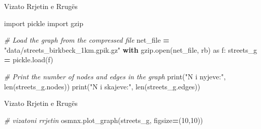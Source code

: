 \documentclass[
  ignorenonframetext,
]{beamer}
\newenvironment{Shaded}{\begin{snugshade}}{\end{snugshade}}
\newcommand{\BuiltInTok}[1]{#1}
\newcommand{\CommentTok}[1]{\textcolor[rgb]{0.56,0.35,0.01}{\textit{#1}}}
\newcommand{\ControlFlowTok}[1]{\textcolor[rgb]{0.13,0.29,0.53}{\textbf{#1}}}
\newcommand{\DecValTok}[1]{\textcolor[rgb]{0.00,0.00,0.81}{#1}}
\newcommand{\ImportTok}[1]{#1}
\newcommand{\NormalTok}[1]{#1}
\newcommand{\OperatorTok}[1]{\textcolor[rgb]{0.81,0.36,0.00}{\textbf{#1}}}
\newcommand{\StringTok}[1]{\textcolor[rgb]{0.31,0.60,0.02}{#1}}
\begin{document}
\begin{frame}[fragile]{Vizato Rrjetin e Rrugës}
\protect\hypertarget{vizato-rrjetin-e-rruguxebs-1}{}

\begin{Shaded}
\begin{Highlighting}[]
\ImportTok{import}\NormalTok{ pickle}
\ImportTok{import}\NormalTok{ gzip}

\CommentTok{\# Load the graph from the compressed file}
\NormalTok{net\_file }\OperatorTok{=} \StringTok{"data/streets\_birkbeck\_1km.gpik.gz"}
\ControlFlowTok{with}\NormalTok{ gzip.}\BuiltInTok{open}\NormalTok{(net\_file, }\StringTok{\textquotesingle{}rb\textquotesingle{}}\NormalTok{) }\ImportTok{as}\NormalTok{ f:}
\NormalTok{    streets\_g }\OperatorTok{=}\NormalTok{ pickle.load(f)}

\CommentTok{\# Print the number of nodes and edges in the graph}
\BuiltInTok{print}\NormalTok{(}\StringTok{"N i nyjeve:"}\NormalTok{, }\BuiltInTok{len}\NormalTok{(streets\_g.nodes))}
\BuiltInTok{print}\NormalTok{(}\StringTok{"N i skajeve:"}\NormalTok{, }\BuiltInTok{len}\NormalTok{(streets\_g.edges))}
\end{Highlighting}
\end{Shaded}
\end{frame}

\begin{frame}[fragile]{Vizato Rrjetin e Rrugës}
\protect\hypertarget{vizato-rrjetin-e-rruguxebs-2}{}

\begin{Shaded}
\begin{Highlighting}[]
\CommentTok{\# vizatoni rrjetin}
\NormalTok{osmnx.plot\_graph(streets\_g, figsize}\OperatorTok{=}\NormalTok{(}\DecValTok{10}\NormalTok{,}\DecValTok{10}\NormalTok{))}
\end{Highlighting}
\end{Shaded}
\end{frame}
\end{document}

